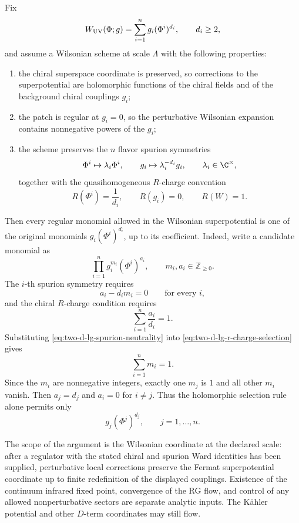 Fix
\[
  W_{\rm UV}(\Phi;g)=\sum_{i=1}^n g_i(\Phi^i)^{d_i},
  \qquad d_i\geq2,
\]
and assume a Wilsonian scheme at scale \(\Lambda\) with the following
properties:
\begin{enumerate}
\item the chiral superspace coordinate is preserved, so corrections to the
  superpotential are holomorphic functions of the chiral fields and of the
  background chiral couplings \(g_i\);
\item the patch is regular at \(g_i=0\), so the perturbative Wilsonian
  expansion contains nonnegative powers of the \(g_i\);
\item the scheme preserves the \(n\) flavor spurion symmetries
  \[
    \Phi^i\mapsto \lambda_i\Phi^i,\qquad
    g_i\mapsto \lambda_i^{-d_i}g_i,
    \qquad \lambda_i\in\C^\times,
  \]
  together with the quasihomogeneous \(R\)-charge convention
  \[
    R(\Phi^i)=\frac1{d_i},\qquad R(g_i)=0,\qquad R(W)=1 .
  \]
\end{enumerate}
Then every regular monomial allowed in the Wilsonian superpotential is one of
the original monomials \(g_i(\Phi^i)^{d_i}\), up to its coefficient.  Indeed,
write a candidate monomial as
\[
  \prod_{i=1}^n g_i^{m_i}(\Phi^i)^{a_i},
  \qquad m_i,a_i\in\mathbb Z_{\geq0}.
\]
The \(i\)-th spurion symmetry requires
\begin{equation}
  a_i-d_i m_i=0
  \qquad\text{for every }i,
  \label{eq:two-d-lg-spurion-neutrality}
\end{equation}
and the chiral \(R\)-charge condition requires
\begin{equation}
  \sum_{i=1}^n\frac{a_i}{d_i}=1 .
  \label{eq:two-d-lg-r-charge-selection}
\end{equation}
Substituting \eqref{eq:two-d-lg-spurion-neutrality} into
\eqref{eq:two-d-lg-r-charge-selection} gives
\[
  \sum_{i=1}^n m_i=1.
\]
Since the \(m_i\) are nonnegative integers, exactly one \(m_j\) is \(1\) and
all other \(m_i\) vanish.  Then \(a_j=d_j\) and \(a_i=0\) for \(i\neq j\).
Thus the holomorphic selection rule alone permits only
\[
  g_j(\Phi^j)^{d_j},
  \qquad j=1,\ldots,n.
\]

The scope of the argument is the Wilsonian coordinate at the declared scale:
after a regulator with the stated chiral and spurion Ward identities has
been supplied, perturbative local corrections preserve the Fermat
superpotential coordinate up to finite redefinition of the displayed
couplings.  Existence of the continuum infrared fixed point, convergence of
the RG flow, and control of any allowed nonperturbative sectors are separate
analytic inputs.  The K\"ahler potential and other \(D\)-term coordinates
may still flow.


